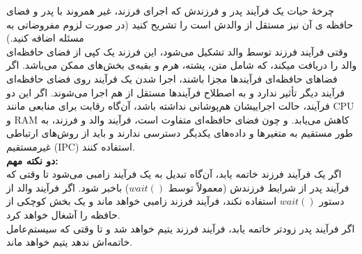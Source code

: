 \documentclass[]{article}
\begin{document}
چرخۀ حیات یک فرآیند پدر و فرزندش که اجرای فرزند، غیر همروند با پدر و فضای حافظه ی آن نیز مستقل از والدش است را تشریح
کنید (در صورت لزوم مفروضاتی به مسئله اضافه کنید.) \\
وقتی فرآیند فرزند توسط والد تشکیل می‌شود، این فرزند یک کپی از فضای حافظه‌ای والد را دریافت میکند، که شامل متن، پشته، هرم و بقیه‌ی بخش‌های ممکن می‌باشد.
اگر فضا‌های حافظه‌ای فرآیند‌ها مجزا باشند، اجرا شدن یک فرآیند روی فضای حافظه‌ای فرآیند دیگر تأثیر ندارد و به اصطلاح فرآیند‌ها مستقل از هم اجرا می‌شوند.
اگر این دو فرآیند، حالت اجراییشان هم‌پوشانی نداشته باشد، آن‌گاه رقابت برای منابعی مانند CPU و RAM کاهش می‌یابد.
و چون فضای حافظه‌ای متفاوت است، فرآیند والد و فرزند، به طور مستقیم به متغیر‌ها و داده‌های یکدیگر دسترسی ندارند و باید از روش‌های ارتباطی غیرمستقیم (IPC) استفاده کنند.\\
\textbf{دو نکته مهم:}
\\
اگر یک فرآیند فرزند خاتمه یابد، آن‌گاه تبدیل به یک فرآیند زامبی می‌شود تا وقتی که فرآیند پدر از شرایط فرزندش (معمولاً توسط $wait()$) باخبر شود.
اگر فرآیند والد از دستور $wait()$ استفاده نکند، فرآیند فرزند زامبی خواهد ماند و یک بخش کوچکی از حافظه را آشغال خواهد کرد.
\\
اگر فرآیند پدر زودتر خاتمه یابد، فرآیند فرزند یتیم خواهد شد و تا وقتی که سیستم‌عامل خاتمه‌اش ندهد یتیم خواهد ماند.
\end{document}
